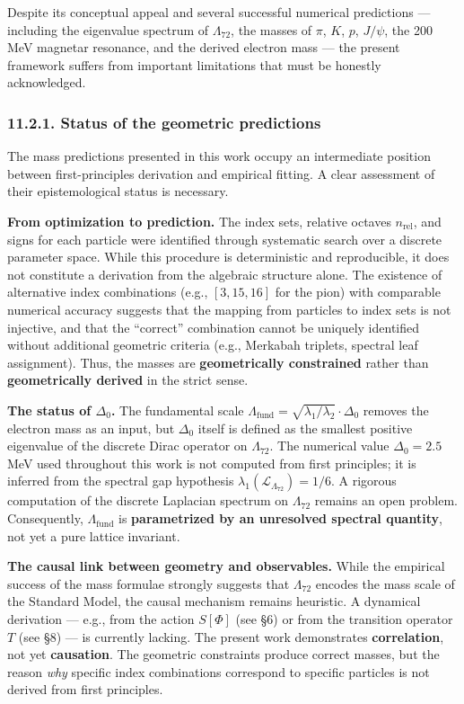 \documentclass[11pt]{article}
\let\oldmathcal\mathcal
\renewcommand{\mathcal}[1]{\oldmathcal{#1}}
\begin{document}
Despite its conceptual appeal and several successful numerical
predictions --- including the eigenvalue spectrum of \(\Lambda_{72}\),
the masses of \(\pi\), \(K\), \(p\), \(J/\psi\), the 200\,MeV magnetar
resonance, and the derived electron mass --- the present framework
suffers from important limitations that must be honestly acknowledged.

\hypertarget{status-of-the-geometric-predictions}{%
\subsubsection{11.2.1. Status of the geometric
predictions}\label{status-of-the-geometric-predictions}}

The mass predictions presented in this work occupy an intermediate
position between first-principles derivation and empirical fitting. A
clear assessment of their epistemological status is necessary.

\textbf{From optimization to prediction.} The index sets, relative
octaves \(n_{\text{rel}}\), and signs for each particle were identified
through systematic search over a discrete parameter space. While this
procedure is deterministic and reproducible, it does not constitute a
derivation from the algebraic structure alone. The existence of
alternative index combinations (e.g., \([3,15,16]\) for the pion) with
comparable numerical accuracy suggests that the mapping from particles
to index sets is not injective, and that the ``correct'' combination
cannot be uniquely identified without additional geometric criteria
(e.g., Merkabah triplets, spectral leaf assignment). Thus, the masses
are \textbf{geometrically constrained} rather than \textbf{geometrically
derived} in the strict sense.

\textbf{The status of \(\Delta_0\).} The fundamental scale
\(\Lambda_{\text{fund}} = \sqrt{\lambda_1/\lambda_2} \cdot \Delta_0\)
removes the electron mass as an input, but \(\Delta_0\) itself is
defined as the smallest positive eigenvalue of the discrete Dirac
operator on \(\Lambda_{72}\). The numerical value
\(\Delta_0 = 2.5\)\,MeV used throughout this work is not computed from
first principles; it is inferred from the spectral gap hypothesis
\(\lambda_1(\mathcal{L}_{\Lambda_{72}}) = 1/6\). A rigorous computation
of the discrete Laplacian spectrum on \(\Lambda_{72}\) remains an open
problem. Consequently, \(\Lambda_{\text{fund}}\) is \textbf{parametrized
by an unresolved spectral quantity}, not yet a pure lattice invariant.

\textbf{The causal link between geometry and observables.} While the
empirical success of the mass formulae strongly suggests that
\(\Lambda_{72}\) encodes the mass scale of the Standard Model, the
causal mechanism remains heuristic. A dynamical derivation --- e.g.,
from the action \(S[\Phi]\) (see §6) or from the transition operator
\(T\) (see §8) --- is currently lacking. The present work demonstrates
\textbf{correlation}, not yet \textbf{causation}. The geometric
constraints produce correct masses, but the reason \emph{why} specific
index combinations correspond to specific particles is not derived from
first principles.
\end{document}
